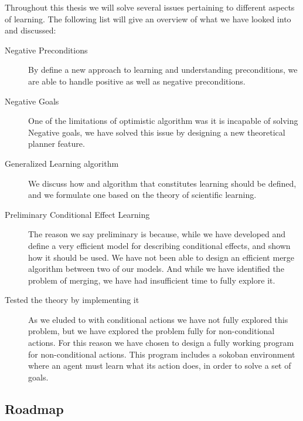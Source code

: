 \documentclass[Master.tex]{subfiles}
\begin{document}
	Throughout this thesis we will solve several issues pertaining to different aspects of learning. The following list will give an overview of what we have looked into and discussed:
	\begin{description}
		\item[Negative Preconditions] 
		By define a new approach to learning and understanding preconditions, we are able to handle positive as well as negative preconditions.
		
		\item[Negative Goals] 
		One of the limitations of \cite{Walsh2008} optimistic algorithm was it is incapable of solving Negative goals, we have solved this issue by designing a new theoretical planner feature.
		
		\item[Generalized Learning algorithm] 
		We discuss how and algorithm that constitutes learning should be defined, and we formulate one based on the theory of scientific learning.
		
		\item[Preliminary Conditional Effect Learning]
		The reason we say preliminary is because, while we have developed and define a very efficient model for describing conditional effects, and shown how it should be used. We have not been able to design an efficient merge algorithm between two of our models. And while we have identified the problem of merging, we have had insufficient time to fully explore it.
		
		\item[Tested the theory by implementing it]
		As we eluded to with conditional actions we have not fully explored this problem, but we have explored the problem fully for non-conditional actions. For this reason we have chosen to design a fully working program for non-conditional actions. 
		This program includes a sokoban environment  where an agent must learn what its action does, in order to solve a set of goals.
		
	\end{description}
	
 \subsection*{Roadmap}
 
\end{document}
